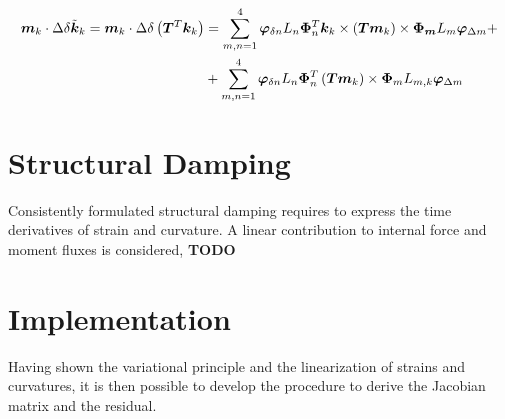 \begin{equation}
\begin{split}
\bm{m}_k \cdot \Delta \delta \tilde{\bm{k}}_k =
\bm{m}_k \cdot \Delta \delta \left( \bm{T}^T \bm{k}_k \right) & =
\sum_{m,n=1}^{4} \bm{\varphi}_{\delta n} L_n \bm{\Phi}_n^T \bm{k}_k \times \left( \bm{T} \bm{m}_k \right) \times \bm{\Phi_{m}} L_m \bm{\varphi}_{\Delta m} + \\
&+\sum_{m,n=1}^{4} \bm{\varphi}_{\delta n} L_n \bm{\Phi}_n^T \left( \bm{T} \bm{m}_k \right) \times \bm{\Phi}_m L_{m,k} \bm{\varphi}_{\Delta m}
\end{split}
\label{eq:Deltadelta_k}
\end{equation}
\section{Structural Damping}
Consistently formulated structural damping requires to express
the time derivatives of strain and curvature.
A linear contribution to internal force and moment fluxes is considered,
\textbf{TODO}
\section{Implementation}
Having shown the variational principle and the linearization of strains and curvatures, it is then possible to develop the procedure to derive the Jacobian matrix and the residual.
